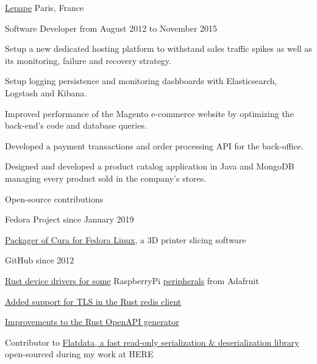 \documentclass[10pt, a4paper]{awesome-cv}
\begin{document}
\begin{cventries}

	\cventrytitle
	{\href{https://www.lepape.com}{Lepape}}
	{Paris, France}

	\cventry
	{Software Developer}
	{from August 2012 to November 2015}
	{
		\begin{cvitems}
			\item {Setup a new dedicated hosting platform to withstand sales traffic spikes as well as its monitoring, failure and recovery strategy.}
			\item {Setup logging persistence and monitoring dashboards with Elasticsearch, Logstash and Kibana.}
			\item {Improved performance of the Magento e-commerce website by optimizing the back-end's code and database queries.}
			\item {Developed a payment transactions and order processing API for the back-office.}
			\item {Designed and developed a product catalog application in Java and MongoDB managing every product sold in the company's stores.}
		\end{cvitems}
	}
\end{cventries}
\vspace{6pt}

\begin{cventries}
	\cventrytitle
	{Open-source contributions}
	{}

	\cventry
	{Fedora Project}
	{since January 2019}
	{
		\begin{cvitems}
			\item{\href{https://src.fedoraproject.org/rpms/cura}{Packager of Cura for Fedora Linux}, a 3D printer slicing software}
		\end{cvitems}
	}

	\cventry
	{GitHub}
	{since 2012}
	{
		\begin{cvitems}
			\item {\href{https://github.com/gferon/rustberrypi-playground}{Rust device drivers for some} RaspberryPi \href{https://github.com/gferon/am2320.rs}{peripherals} from Adafruit}
			\item {\href{https://github.com/mitsuhiko/redis-rs/pull/305}{Added support for TLS in the Rust redis client}}
			\item {\href{https://github.com/OpenAPITools/openapi-generator/pulls?q=is\%3Apr+author\%3Agferon+is\%3Aclosed}{Improvements to the Rust OpenAPI generator}}
			\item {Contributor to \href{https://github.com/heremaps/flatdata}{Flatdata, a fast read-only serialization \& deserialization library} open-sourced during my work at HERE}
		\end{cvitems}
	}
\end{cventries}
\vspace{6pt}
\end{document}
